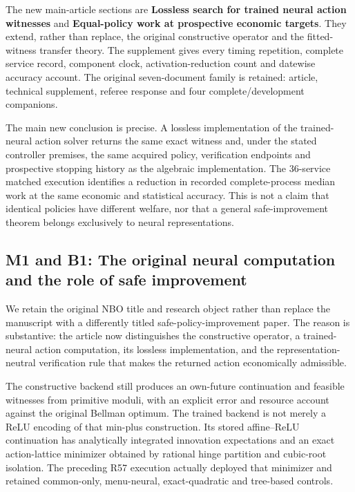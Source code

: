 \documentclass[ecta,nameyear,draft]{econsocart}
\begin{document}
The new main-article sections are \textbf{Lossless search for trained
neural action witnesses} and \textbf{Equal-policy work at prospective
economic targets}. They extend, rather than replace, the original
constructive operator and the fitted-witness transfer theory. The
supplement gives every timing repetition, complete service record,
component clock, activation-reduction count and datewise accuracy
account. The original seven-document family is retained: article,
technical supplement, referee response and four complete/development
companions.

The main new conclusion is precise. A lossless implementation of the
trained-neural action solver returns the same exact witness and, under
the stated controller premises, the same acquired policy, verification
endpoints and prospective stopping history as the algebraic
implementation. The 36-service matched execution identifies a reduction
in recorded complete-process median work at the same economic and
statistical accuracy. This is not a claim that identical policies have
different welfare, nor that a general safe-improvement theorem belongs
exclusively to neural representations.

\hypertarget{m1-and-b1-the-original-neural-computation-and-the-role-of-safe-improvement}{%
\subsection{M1 and B1: The original neural computation and the role of
safe
improvement}\label{m1-and-b1-the-original-neural-computation-and-the-role-of-safe-improvement}}

We retain the original NBO title and research object rather than replace
the manuscript with a differently titled safe-policy-improvement paper.
The reason is substantive: the article now distinguishes the
constructive operator, a trained-neural action computation, its lossless
implementation, and the representation-neutral verification rule that
makes the returned action economically admissible.

The constructive backend still produces an own-future continuation and
feasible witnesses from primitive moduli, with an explicit error and
resource account against the original Bellman optimum. The trained
backend is not merely a ReLU encoding of that min-plus construction. Its
stored affine--ReLU continuation has analytically integrated innovation
expectations and an exact action-lattice minimizer obtained by rational
hinge partition and cubic-root isolation. The preceding R57 execution
actually deployed that minimizer and retained common-only, menu-neural,
exact-quadratic and tree-based controls.
\end{document}
